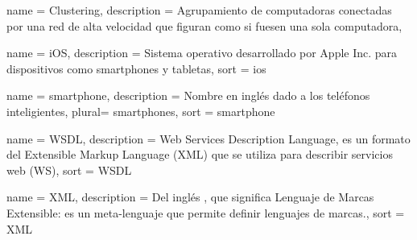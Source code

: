 \newpage

 {
  name = {Clustering},
  description = {Agrupamiento de computadoras conectadas por una red de alta velocidad que figuran como si fuesen una sola computadora},
}

 {
  name = {iOS},
  description = {Sistema operativo desarrollado por Apple Inc. para dispositivos
  como smartphones y tabletas}, sort = {ios}
}

 {
  name = {smartphone},
  description = {Nombre en inglés dado a los teléfonos inteligientes},
  plural= {smartphones},
  sort = {smartphone}
}

 {
  name = {WSDL},
  description = {Web Services Description Language, es un formato del Extensible Markup Language (XML) que se utiliza para describir servicios web (WS)},
  sort = {WSDL}
}

 {
  name = {XML},
  description = {Del inglés , que significa Lenguaje de Marcas Extensible: es un meta-lenguaje que permite definir lenguajes de marcas.},
  sort = {XML}
}



